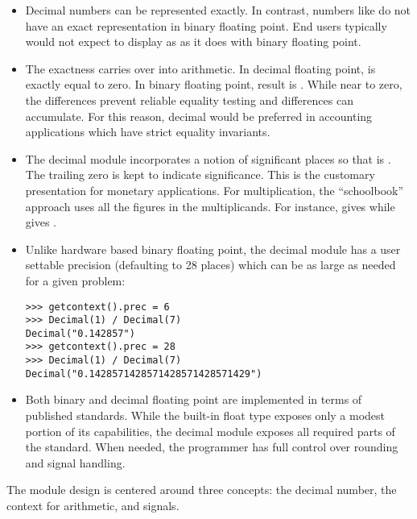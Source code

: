 \begin{itemize}

\item Decimal numbers can be represented exactly.  In contrast, numbers like
 do not have an exact representation in binary floating point.
End users typically would not expect  to display as
 as it does with binary floating point.

\item The exactness carries over into arithmetic.  In decimal floating point,
 is exactly equal to zero.  In binary floating
point, result is .  While near to zero, the
differences prevent reliable equality testing and differences can accumulate.
For this reason, decimal would be preferred in accounting applications which
have strict equality invariants.

\item The decimal module incorporates a notion of significant places so that
 is .  The trailing zero is kept to indicate
significance.  This is the customary presentation for monetary applications. For
multiplication, the ``schoolbook'' approach uses all the figures in the
multiplicands.  For instance,  gives  while
 gives .

\item Unlike hardware based binary floating point, the decimal module has a user
settable precision (defaulting to 28 places) which can be as large as needed for
a given problem:

\begin{verbatim}
>>> getcontext().prec = 6
>>> Decimal(1) / Decimal(7)
Decimal("0.142857")
>>> getcontext().prec = 28
>>> Decimal(1) / Decimal(7)
Decimal("0.1428571428571428571428571429")
\end{verbatim}

\item Both binary and decimal floating point are implemented in terms of published
standards.  While the built-in float type exposes only a modest portion of its
capabilities, the decimal module exposes all required parts of the standard.
When needed, the programmer has full control over rounding and signal handling.

\end{itemize}


The module design is centered around three concepts:  the decimal number, the
context for arithmetic, and signals.

